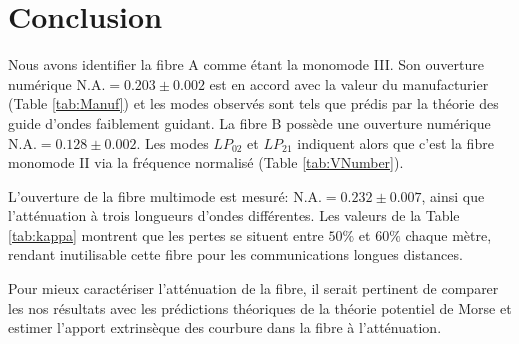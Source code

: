 \documentclass[10pt,letterpaper,twocolumn]{article}
\newcommand{\na}{\text{N.A.}}
\begin{document}
\section{Conclusion}\label{sec:conclusion} %
Nous avons identifier la fibre A comme étant la monomode III. Son ouverture numérique $\na = 0.203 \pm 0.002$ est en accord avec la valeur du manufacturier (Table \ref{tab:Manuf}) et les modes observés sont tels que prédis par la théorie des guide d'ondes faiblement guidant. La fibre B possède une ouverture numérique $\na = 0.128 \pm  0.002$. Les modes $LP_{02}$ et $LP_{21}$ indiquent alors que c'est la fibre monomode II via la fréquence normalisé (Table \ref{tab:VNumber}).\par
L'ouverture de la fibre multimode est mesuré: ${\na =  0.232 \pm 0.007}$, ainsi que l'atténuation à trois longueurs d'ondes différentes. Les valeurs de la Table \ref{tab:kappa} montrent que les pertes se situent entre $50\%$ et $60\%$ chaque mètre, rendant inutilisable cette fibre pour les communications longues distances. \par
Pour mieux caractériser l'atténuation de la fibre, il serait pertinent de comparer les nos résultats avec les prédictions théoriques de la théorie potentiel de Morse\supercite{Ishigure1995} et estimer l'apport extrinsèque des courbure dans la fibre à l'atténuation.


\printbibliography
\end{document}
